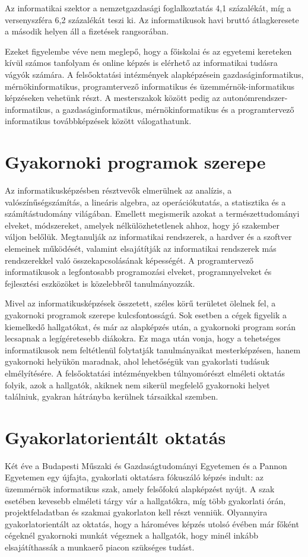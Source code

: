 \documentclass{thesis-ekf}
\begin{document}
Az informatikai szektor a nemzetgazdasági foglalkoztatás 4,1 százalékát, míg a versenyszféra 6,2 százalékát teszi ki. Az informatikusok havi bruttó átlagkeresete a második helyen áll a fizetések rangsorában.

Ezeket figyelembe véve nem meglepő, hogy a főiskolai és az egyetemi kereteken kívül számos tanfolyam és online képzés is elérhető az informatikai tudásra vágyók számára. A felsőoktatási intézmények alapképzésein gazdaságinformatikus, mérnökinformatikus, programtervező informatikus és üzemmérnök-informatikus képzéseken vehetünk részt. A mesterszakok között pedig az autonómrendszer-informatikus, a gazdaságinformatikus, mérnökinformatikus és a programtervező informatikus továbbképzések között válogathatunk.

\section{Gyakornoki programok szerepe}
Az informatikusképzésben résztvevők elmerülnek az analízis, a valószínűségszámítás, a lineáris algebra, az operációkutatás, a statisztika és a számítástudomány világában. Emellett megismerik azokat a természettudományi elveket, módszereket, amelyek nélkülözhetetlenek ahhoz, hogy jó szakember váljon belőlük. Megtanulják az informatikai rendszerek, a hardver és a szoftver elemeinek működését, valamint elsajátítják az informatikai rendszerek más rendszerekkel való összekapcsolásának képességét. A programtervező informatikusok a legfontosabb programozási elveket, programnyelveket és fejlesztési eszközöket is közelebbről tanulmányozzák.

Mivel az informatikusképzések összetett, széles körű területet ölelnek fel, a gyakornoki programok szerepe kulcsfontosságú. Sok esetben a cégek figyelik a kiemelkedő hallgatókat, és már az alapképzés után, a gyakornoki program során lecsapnak a legígéretesebb diákokra. Ez maga után vonja, hogy a tehetséges informatikusok nem feltétlenül folytatják tanulmányaikat mesterképzésen, hanem gyakornoki helyükön maradnak, ahol lehetőségük van gyakorlati tudásuk elmélyítésére. A felsőoktatási intézményekben túlnyomórészt elméleti oktatás folyik, azok a hallgatók, akiknek nem sikerül megfelelő gyakornoki helyet találniuk, gyakran hátrányba kerülnek társaikkal szemben.

\section{Gyakorlatorientált oktatás}
Két éve a Budapesti Műszaki és Gazdaságtudományi Egyetemen és a Pannon Egyetemen egy újfajta, gyakorlati oktatásra fókuszáló képzés indult: az üzemmérnök informatikus szak, amely felsőfokú alapképzést nyújt. A szak esetében kevesebb elméleti tárgy vár a hallgatókra, míg több gyakorlati órán, projektfeladatban és szakmai gyakorlaton kell részt venniük. Olyannyira gyakorlatorientált az oktatás, hogy a hároméves képzés utolsó évében már főként cégeknél gyakornoki munkát végeznek a hallgatók, hogy minél inkább elsajátíthassák a munkaerő piacon szükséges tudást.
\end{document}
